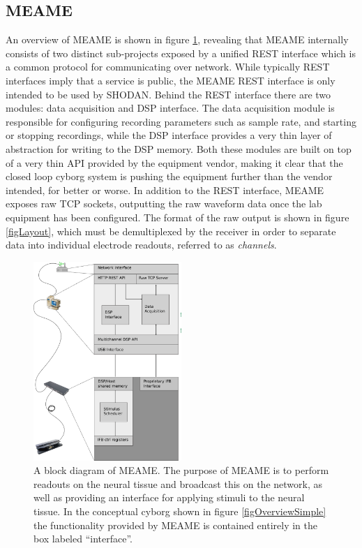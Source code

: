 \subsection{MEAME}
An overview of MEAME is shown in figure \ref{figMEAME}, revealing that MEAME internally
consists of two distinct sub-projects exposed by a unified REST interface which
is a common protocol for communicating over network.
While typically REST interfaces imply that a service is public, the MEAME REST
interface is only intended to be used by SHODAN.
%
Behind the REST interface there are two modules: data acquisition and DSP interface.
%
The data acquisition module is responsible for configuring recording parameters
such as sample rate, and starting or stopping recordings, while the DSP interface
provides a very thin layer of abstraction for writing to the DSP memory.
%
Both these modules are built on top of a very thin API provided by the equipment
vendor, making it clear that the closed loop cyborg system is pushing the
equipment further than the vendor intended, for better or worse.
%
In addition to the REST interface, MEAME exposes raw TCP sockets, outputting the
raw waveform data once the lab equipment has been configured.
%
The format of the raw output is shown in figure \ref{figLayout}, which must be
demultiplexed by the receiver in order to separate data into individual
electrode readouts, referred to as \emph{channels}.
%
\begin{figure}[h!]
  \centering
  \includegraphics[width=0.5\textwidth]{fig/MEAME.png}
  \caption[Block diagram of MEAME]{
    A block diagram of MEAME.
    The purpose of MEAME is to perform readouts on the neural tissue and
    broadcast this on the network, as well as providing an interface for
    applying stimuli to the neural tissue.
    In the conceptual cyborg shown in figure \ref{figOverviewSimple} the
    functionality provided by MEAME is contained entirely in the box labeled
    ``interface''.
  }
  \label{figMEAME}
\end{figure}
